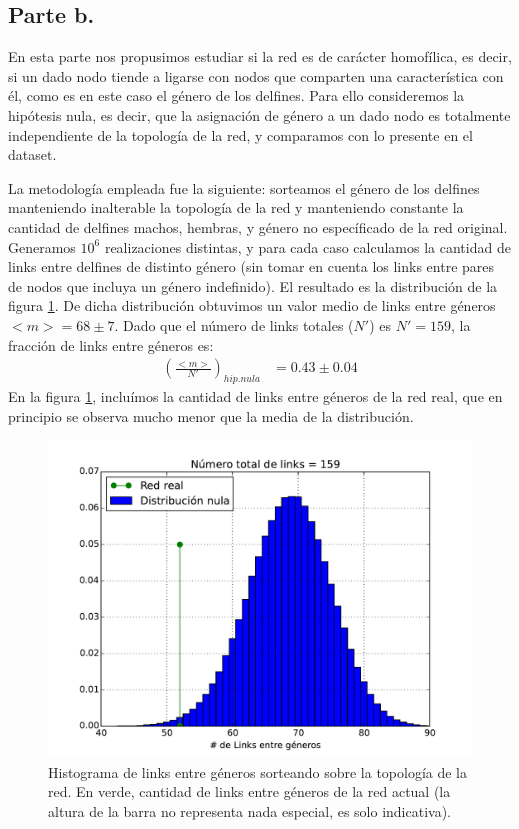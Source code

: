 \subsection{Parte b.}

\par En esta parte nos propusimos estudiar si la red es de carácter homofílica, es decir, si un dado nodo tiende a ligarse con nodos que comparten una característica con él, como es en este caso el género de los delfines. Para ello consideremos la hipótesis nula, es decir, que la asignación de género a un dado nodo es totalmente independiente de la topología de la red, y comparamos con lo presente en el dataset.
\par La metodología empleada fue la siguiente: sorteamos el género de los delfines manteniendo inalterable la topología de la red y manteniendo constante la cantidad de delfines machos, hembras, y género no específicado de la red original. Generamos $10^{6}$ realizaciones distintas, y para cada caso calculamos la cantidad de links entre delfines de distinto género (sin tomar en cuenta los links entre pares de nodos que incluya un género indefinido). El resultado es la distribución de la figura \ref{fig:Histograma}.
De dicha distribución obtuvimos un valor medio de links entre géneros $<m> = 68 \pm 7$. Dado que el número de links totales ($N'$) es $N' = 159$, la fracción de links entre géneros es:
\begin{align*}
	(\frac{<m>}{N'})_{hip.nula} & = 0.43 \pm 0.04
\end{align*}
En la figura \ref{fig:Histograma}, incluímos la cantidad de links entre géneros de la red real, que en principio se observa mucho menor que la media de la distribución.

\begin{figure}
\centering
\includegraphics[scale = 0.70]{figuras/Histograma-eps-converted-to.pdf}
\caption{Histograma de links entre géneros sorteando sobre la topología de la red. En verde, cantidad de links entre géneros de la red actual (la altura de la barra no representa nada especial, es solo indicativa).}
\label{fig:Histograma}
\end{figure}

